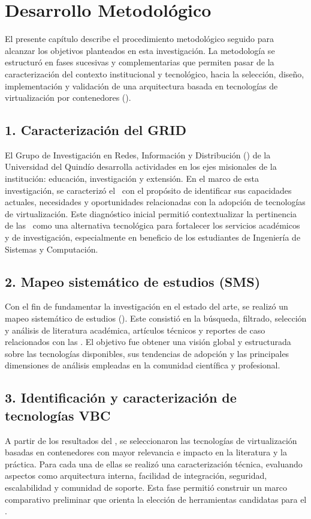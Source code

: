 \chapter*{Desarrollo Metodológico}
\label{cap:desarrolloMetodologico}

El presente capítulo describe el procedimiento metodológico seguido para alcanzar los objetivos planteados en esta investigación. La metodología se estructuró en fases sucesivas y complementarias que permiten pasar de la caracterización del contexto institucional y tecnológico, hacia la selección, diseño, implementación y validación de una arquitectura basada en tecnologías de virtualización por contenedores (\VBC).  

\section*{1. Caracterización del GRID}
El Grupo de Investigación en Redes, Información y Distribución (\GRID) de la Universidad del Quindío desarrolla actividades en los ejes misionales de la institución: educación, investigación y extensión. En el marco de esta investigación, se caracterizó el \GRID\ con el propósito de identificar sus capacidades actuales, necesidades y oportunidades relacionadas con la adopción de tecnologías de virtualización. Este diagnóstico inicial permitió contextualizar la pertinencia de las \VBC\ como una alternativa tecnológica para fortalecer los servicios académicos y de investigación, especialmente en beneficio de los estudiantes de Ingeniería de Sistemas y Computación.

\section*{2. Mapeo sistemático de estudios (SMS)}
Con el fin de fundamentar la investigación en el estado del arte, se realizó un mapeo sistemático de estudios (\SMS). Este consistió en la búsqueda, filtrado, selección y análisis de literatura académica, artículos técnicos y reportes de caso relacionados con las \VBC. El objetivo fue obtener una visión global y estructurada sobre las tecnologías disponibles, sus tendencias de adopción y las principales dimensiones de análisis empleadas en la comunidad científica y profesional.

\section*{3. Identificación y caracterización de tecnologías VBC}
A partir de los resultados del \SMS, se seleccionaron las tecnologías de virtualización basadas en contenedores con mayor relevancia e impacto en la literatura y la práctica. Para cada una de ellas se realizó una caracterización técnica, evaluando aspectos como arquitectura interna, facilidad de integración, seguridad, escalabilidad y comunidad de soporte. Esta fase permitió construir un marco comparativo preliminar que orienta la elección de herramientas candidatas para el \GRID.

